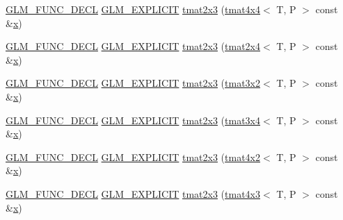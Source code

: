 \begin{DoxyCompactItemize}
\item 
\mbox{\hyperlink{setup_8hpp_ab2d052de21a70539923e9bcbf6e83a51}{G\+L\+M\+\_\+\+F\+U\+N\+C\+\_\+\+D\+E\+CL}} \mbox{\hyperlink{setup_8hpp_a6c74f5a5e7b134ab69023ff9a30d4d5d}{G\+L\+M\+\_\+\+E\+X\+P\+L\+I\+C\+IT}} \mbox{\hyperlink{structglm_1_1tmat2x3_a8797fae4349161789ddaf71c932a1a49}{tmat2x3}} (\mbox{\hyperlink{structglm_1_1tmat4x4}{tmat4x4}}$<$ T, P $>$ const \&\mbox{\hyperlink{glad_8h_a92d0386e5c19fb81ea88c9f99644ab1d}{x}})
\item 
\mbox{\hyperlink{setup_8hpp_ab2d052de21a70539923e9bcbf6e83a51}{G\+L\+M\+\_\+\+F\+U\+N\+C\+\_\+\+D\+E\+CL}} \mbox{\hyperlink{setup_8hpp_a6c74f5a5e7b134ab69023ff9a30d4d5d}{G\+L\+M\+\_\+\+E\+X\+P\+L\+I\+C\+IT}} \mbox{\hyperlink{structglm_1_1tmat2x3_a23808a1c5d5674c6ebb0486c2ae2fe81}{tmat2x3}} (\mbox{\hyperlink{structglm_1_1tmat2x4}{tmat2x4}}$<$ T, P $>$ const \&\mbox{\hyperlink{glad_8h_a92d0386e5c19fb81ea88c9f99644ab1d}{x}})
\item 
\mbox{\hyperlink{setup_8hpp_ab2d052de21a70539923e9bcbf6e83a51}{G\+L\+M\+\_\+\+F\+U\+N\+C\+\_\+\+D\+E\+CL}} \mbox{\hyperlink{setup_8hpp_a6c74f5a5e7b134ab69023ff9a30d4d5d}{G\+L\+M\+\_\+\+E\+X\+P\+L\+I\+C\+IT}} \mbox{\hyperlink{structglm_1_1tmat2x3_a2743481f193e33c3732697620ba9a0d7}{tmat2x3}} (\mbox{\hyperlink{structglm_1_1tmat3x2}{tmat3x2}}$<$ T, P $>$ const \&\mbox{\hyperlink{glad_8h_a92d0386e5c19fb81ea88c9f99644ab1d}{x}})
\item 
\mbox{\hyperlink{setup_8hpp_ab2d052de21a70539923e9bcbf6e83a51}{G\+L\+M\+\_\+\+F\+U\+N\+C\+\_\+\+D\+E\+CL}} \mbox{\hyperlink{setup_8hpp_a6c74f5a5e7b134ab69023ff9a30d4d5d}{G\+L\+M\+\_\+\+E\+X\+P\+L\+I\+C\+IT}} \mbox{\hyperlink{structglm_1_1tmat2x3_aa2f1a3ee821a8ac9f2ee610a27b2786b}{tmat2x3}} (\mbox{\hyperlink{structglm_1_1tmat3x4}{tmat3x4}}$<$ T, P $>$ const \&\mbox{\hyperlink{glad_8h_a92d0386e5c19fb81ea88c9f99644ab1d}{x}})
\item 
\mbox{\hyperlink{setup_8hpp_ab2d052de21a70539923e9bcbf6e83a51}{G\+L\+M\+\_\+\+F\+U\+N\+C\+\_\+\+D\+E\+CL}} \mbox{\hyperlink{setup_8hpp_a6c74f5a5e7b134ab69023ff9a30d4d5d}{G\+L\+M\+\_\+\+E\+X\+P\+L\+I\+C\+IT}} \mbox{\hyperlink{structglm_1_1tmat2x3_a0e17446454497d323a6f1dc09a68ea5f}{tmat2x3}} (\mbox{\hyperlink{structglm_1_1tmat4x2}{tmat4x2}}$<$ T, P $>$ const \&\mbox{\hyperlink{glad_8h_a92d0386e5c19fb81ea88c9f99644ab1d}{x}})
\item 
\mbox{\hyperlink{setup_8hpp_ab2d052de21a70539923e9bcbf6e83a51}{G\+L\+M\+\_\+\+F\+U\+N\+C\+\_\+\+D\+E\+CL}} \mbox{\hyperlink{setup_8hpp_a6c74f5a5e7b134ab69023ff9a30d4d5d}{G\+L\+M\+\_\+\+E\+X\+P\+L\+I\+C\+IT}} \mbox{\hyperlink{structglm_1_1tmat2x3_a1c167271dd959e664021e1accd456bf1}{tmat2x3}} (\mbox{\hyperlink{structglm_1_1tmat4x3}{tmat4x3}}$<$ T, P $>$ const \&\mbox{\hyperlink{glad_8h_a92d0386e5c19fb81ea88c9f99644ab1d}{x}})

\end{DoxyCompactItemize}
